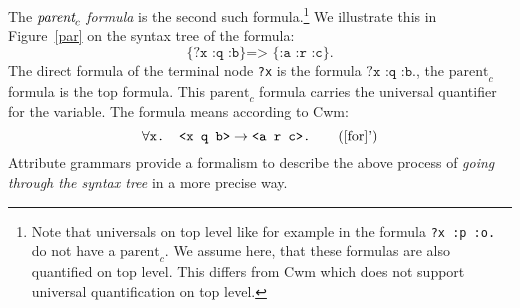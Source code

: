 The $\emph{parent}_c$ \emph{formula} is the second such formula.\footnote{Note that universals on top level like for example in the formula \texttt{?x :p :o.} 
do not have a $\text{parent}_c$. 
We assume here, that these formulas are also quantified on top level. This differs from Cwm which does not support universal quantification on top level.}
%
%
%
We illustrate this in Figure~\ref{par} on the syntax tree of the formula:
\begin{equation}
 \texttt{\{?x :q :b\} => \{:a :r :c\}.}\label{for}
\end{equation}
The direct formula of the terminal node \texttt{?x} is the formula $\texttt{?x :q :b.}$, the
$\text{parent}_c$ formula is the 
top formula. This $\text{parent}_c$ formula carries the universal quantifier for the variable.
 The formula means according to Cwm:
\begin{equation}
\forall \texttt{x. <x q b>}\rightarrow  \texttt{<a r c>.}
 \tag{\ref{for}'}
\end{equation}
Attribute grammars provide a formalism to describe the above process of \emph{going through the syntax tree} in a more precise way. 



